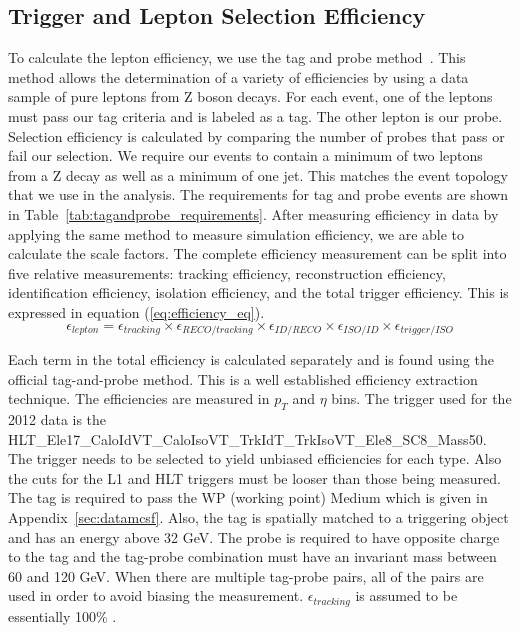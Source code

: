 \subsection{Trigger and Lepton Selection Efficiency}

To calculate the lepton efficiency, we use the tag and probe method~\cite{TagandProbe2012}. This method allows the determination of a variety of efficiencies by using a data sample of pure leptons from Z boson decays.  For each event, one of the leptons must pass our tag criteria and is labeled as a tag.  The other lepton is our probe. Selection efficiency is calculated by comparing the number of probes that pass or fail our selection. We require our events to contain a minimum of two leptons from a Z decay as well as a minimum of one jet.  This matches the event topology that we use in the analysis. The requirements for tag and probe events are shown in Table~\ref{tab:tagandprobe_requirements}. After measuring efficiency in data by applying the same method to measure simulation efficiency, we are able to calculate the scale factors. The complete efficiency measurement can be split into five relative measurements: tracking efficiency, reconstruction efficiency, identification efficiency, isolation efficiency, and the total trigger efficiency.  This is expressed in equation (\ref{eq:efficiency_eq}).
\begin{equation}
\epsilon_{lepton} = \epsilon_{tracking} \times \epsilon_{RECO/tracking} \times \epsilon_{ID/RECO} \times \epsilon_{ISO/ID} \times \epsilon_{trigger/ISO}
\label{eq:efficiency_eq}
\end{equation}

Each term in the total efficiency is calculated separately and is found using the official tag-and-probe method. This is a well established efficiency extraction technique. The efficiencies are measured in $p_T$ and $\eta$ bins. The trigger used for the 2012 data is the HLT\_Ele17\_CaloIdVT\_CaloIsoVT\_TrkIdT\_TrkIsoVT\_Ele8\_SC8\_Mass50. The trigger needs to be selected to yield unbiased efficiencies for each type. Also the cuts for the L1 and HLT triggers must be looser than those being measured. The tag is required to pass the WP (working point) Medium which is given in Appendix~\ref{sec:datamcsf}. Also, the tag is spatially matched to a triggering object and has an energy above 32 GeV. The probe is required to have opposite charge to the tag and the tag-probe combination must have an invariant mass between 60 and 120 GeV.  When there are multiple tag-probe pairs, all of the pairs are used in order to avoid biasing the measurement. $\epsilon_{tracking}$ is assumed to be essentially 100\% \cite{WandZCrossSections}.


